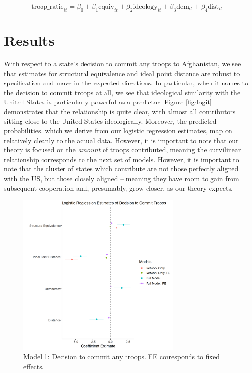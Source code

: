 \documentclass[12pt,letterpaper]{article}
\begin{document}
			\vspace{-2em}
			\begin{equation*}
				\text{troop\_ratio}_{it} = \beta_0 + \beta_1\text{equiv}_{it} +
				\beta_2\text{ideology}_{it} + \beta_3\text{dem}_{it} + \beta_4\text{dist}_{it}
			\end{equation*}

\section{Results}
	With respect to a state's decision to commit any troops to Afghanistan, we see that estimates for structural equivalence and ideal point distance are robust to specification and move in the expected directions. In particular, when it comes to the decision to commit troops at all, we see that ideological similarity with the United States is particularly powerful as a predictor. Figure \ref{fig:logit} demonstrates that the relationship is quite clear, with almost all contributors sitting close to the United States ideologically. Moreover, the predicted probabilities, which we derive from our logistic regression estimates, map on relatively cleanly to the actual data. However, it is important to note that our theory is focused on the \textit{amount} of troops contributed, meaning the curvilinear relationship corresponds to the next set of models. However, it is important to note that the cluster of states which contribute are not those perfectly aligned with the US, but those closely aligned -- meaning they have room to gain from subsequent cooperation and, presumably, grow closer, as our theory expects.

	\begin{figure}[H]
		\centering
		\includegraphics[width=0.725\textwidth]{logit_coef.png}
		\caption{Model 1: Decision to commit any troops. FE corresponds to fixed effects.}
		\label{fig:logit_reg}
	\end{figure}
	
\end{document}
